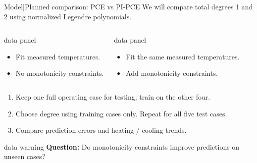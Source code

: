 \begin{frame}{Model\enspace|\enspace Planned comparison: PCE vs PI-PCE}
  \small We will compare total degrees 1 and 2 using normalized Legendre polynomials.
  \par\medskip
  \begin{columns}[T,onlytextwidth]
      \begin{beamercolorbox}[sep=2.5mm,wd=\linewidth]{data panel}
        \small
        \begin{itemize}
          \item Fit measured temperatures.
          \item No monotonicity constraints.
        \end{itemize}
      \end{beamercolorbox}
      \begin{beamercolorbox}[sep=2.5mm,wd=\linewidth]{data panel}
        \small
        \begin{itemize}
          \item Fit the same measured temperatures.
          \item Add monotonicity constraints.
        \end{itemize}
      \end{beamercolorbox}
  \end{columns}
  \medskip
  \small
  \begin{enumerate}
    \item Keep one full operating case for testing; train on the other four.
    \item Choose degree using training cases only. Repeat for all five test cases.
    \item Compare prediction errors and heating / cooling trends.
  \end{enumerate}
  \smallskip
  \begin{beamercolorbox}[sep=2mm,wd=\textwidth]{data warning}
    \small \textbf{Question:} Do monotonicity constraints improve predictions on unseen cases?
  \end{beamercolorbox}
\end{frame}
